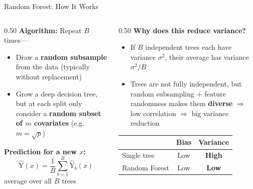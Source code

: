 \documentclass[hyperref={pdfpagelabels=false}]{beamer}
\begin{document}
\begin{frame}{Random Forest: How It Works}
\begin{columns}[T]
	\begin{column}{0.50\textwidth}
		\small
		\textbf{Algorithm:} Repeat $B$ times---
		\vspace{0.2cm}
		\begin{itemize}
			\item[1.] Draw a \textbf{random subsample} from the data (typically without replacement)
			\vspace{0.2cm}
			\item[2.] Grow a deep decision tree, but at each split only consider a \textbf{random subset of $m$ covariates} (e.g.\ $m=\sqrt{p}$)
		\end{itemize}
		\vspace{0.3cm}
		\textbf{Prediction for a new $x$:}
		\begin{equation*}
			\hat{\mathrm{Y}}(x) = \frac{1}{B}\sum_{b=1}^{B} \hat{\mathrm{Y}}_{b}(x)
		\end{equation*}
		average over all $B$ trees
	\end{column}
	\begin{column}{0.50\textwidth}
		\small
		\textbf{Why does this reduce variance?}
		\vspace{0.2cm}
		\begin{itemize}
			\item If $B$ independent trees each have variance $\sigma^2$, their average has variance $\sigma^2/B$
			\vspace{0.2cm}
			\item Trees are not fully independent, but random subsampling $+$ feature randomness makes them \textbf{diverse} $\Rightarrow$ low correlation $\Rightarrow$ big variance reduction
		\end{itemize}
		\vspace{0.3cm}
		\begin{tabular}{lcc}
			\toprule
			 & Bias & Variance \\
			\midrule
			Single tree & Low & \textbf{High} \\
			Random Forest & Low & \textbf{Low} \\
			\bottomrule
		\end{tabular}
	\end{column}
\end{columns}
\end{frame}
\end{document}
